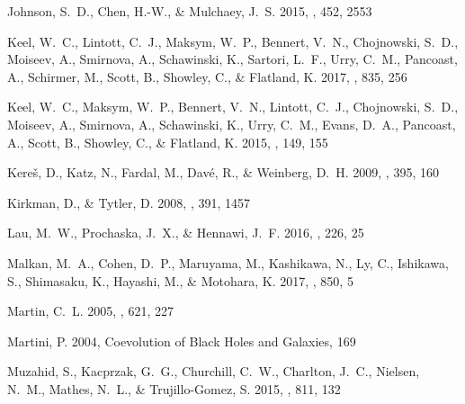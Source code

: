 \documentclass[iop]{emulateapj}
\begin{document}
\begin{thebibliography}{61}
{Johnson}, S.~D., {Chen}, H.-W., \& {Mulchaey}, J.~S. 2015, \mnras, 452, 2553

{Keel}, W.~C., {Lintott}, C.~J., {Maksym}, W.~P., {Bennert}, V.~N.,
  {Chojnowski}, S.~D., {Moiseev}, A., {Smirnova}, A., {Schawinski}, K.,
  {Sartori}, L.~F., {Urry}, C.~M., {Pancoast}, A., {Schirmer}, M., {Scott}, B.,
  {Showley}, C., \& {Flatland}, K. 2017, \apj, 835, 256

{Keel}, W.~C., {Maksym}, W.~P., {Bennert}, V.~N., {Lintott}, C.~J.,
  {Chojnowski}, S.~D., {Moiseev}, A., {Smirnova}, A., {Schawinski}, K., {Urry},
  C.~M., {Evans}, D.~A., {Pancoast}, A., {Scott}, B., {Showley}, C., \&
  {Flatland}, K. 2015, \aj, 149, 155

{Kere\v{s}}, D., {Katz}, N., {Fardal}, M., {Dav{\'e}}, R., \& {Weinberg}, D.~H.
  2009, \mnras, 395, 160

{Kirkman}, D., \& {Tytler}, D. 2008, \mnras, 391, 1457

{Lau}, M.~W., {Prochaska}, J.~X., \& {Hennawi}, J.~F. 2016, \apjs, 226, 25

{Malkan}, M.~A., {Cohen}, D.~P., {Maruyama}, M., {Kashikawa}, N., {Ly}, C.,
  {Ishikawa}, S., {Shimasaku}, K., {Hayashi}, M., \& {Motohara}, K. 2017, \apj,
  850, 5

{Martin}, C.~L. 2005, \apj, 621, 227

{Martini}, P. 2004, Coevolution of Black Holes and Galaxies, 169

{Muzahid}, S., {Kacprzak}, G.~G., {Churchill}, C.~W., {Charlton}, J.~C.,
  {Nielsen}, N.~M., {Mathes}, N.~L., \& {Trujillo-Gomez}, S. 2015, \apj, 811,
  132


\end{thebibliography}
\end{document}
